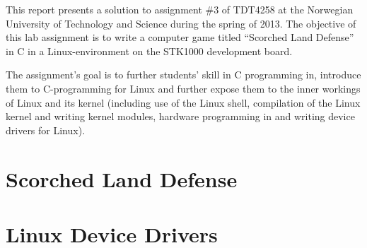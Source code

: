 This report presents a solution to assignment \#3 of TDT4258 at the Norwegian University of Technology and Science during the spring of 2013. The objective of this lab assignment is to write a computer game titled ``Scorched Land Defense'' in C in a Linux-environment on the STK1000 development board. 

The assignment's goal is to further students' skill in C programming in, introduce them to C-programming for Linux and further expose them to the inner workings of Linux and its kernel (including use of the Linux shell, compilation of the Linux kernel and writing kernel modules, hardware programming in and writing device drivers for Linux).

\section{Scorched Land Defense}
	

\section{Linux Device Drivers}
	
	